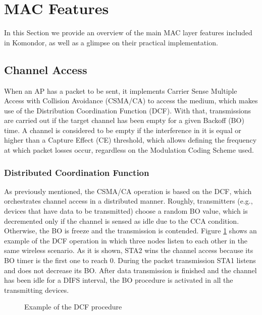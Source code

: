 \documentclass[a4paper]{article}
\begin{document}
\section{MAC Features}
\label{section:mac_features}
In this Section we provide an overview of the main MAC layer features included in Komondor, as well as a glimpse on their practical implementation.
	
	\subsection{Channel Access}
	\label{section:channel_access}
	When an AP has a packet to be sent, it implements Carrier Sense Multiple Access with Collision Avoidance (CSMA/CA) to access the medium, which makes use of the Distribution Coordination Function (DCF). With that, transmissions are carried out if the target channel has been empty for a given Backoff (BO) time. A channel is considered to be empty if the interference in it is equal or higher than a Capture Effect (CE) threshold, which allows defining the frequency at which packet losses occur, regardless on the Modulation Coding Scheme used.
		
		\subsubsection{Distributed Coordination Function}
		\label{section:dcf}		
		As previously mentioned, the CSMA/CA operation is based on the DCF, which orchestrates channel access in a distributed manner. Roughly, transmitters (e.g., devices that have data to be transmitted) choose a random BO value, which is decremented only if the channel is sensed as idle due to the CCA condition. Otherwise, the BO is freeze and the transmission is contended. Figure \ref{fig:dcf_operation} shows an example of the DCF operation in which three nodes listen to each other in the same wireless scenario. As it is shown, STA2 wins the channel access because its BO timer is the first one to reach 0. During the packet transmission STA1 listens and does not decrease its BO. After data transmission is finished and the channel has been idle for a DIFS interval, the BO procedure is activated in all the transmitting devices.
		\begin{figure}[h!]
			\centering
			\caption{Example of the DCF procedure}
			\label{fig:dcf_operation}
		\end{figure}
			
\end{document}
